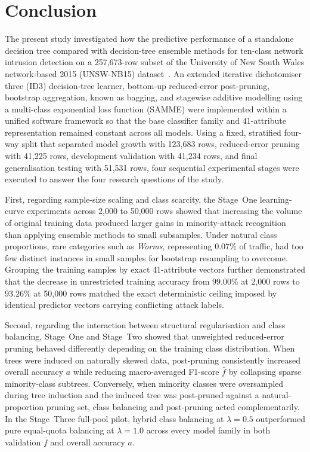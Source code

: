 \section{Conclusion}
\label{sec:conclusion}

The present study investigated how the predictive performance of a standalone decision tree compared with decision-tree ensemble methods for ten-class network intrusion detection on a 257,673-row subset of the University of New South Wales network-based 2015 (UNSW-NB15) dataset~\cite{Moustafa2015}. An extended iterative dichotomiser three (ID3) decision-tree learner, bottom-up reduced-error post-pruning, bootstrap aggregation, known as bagging, and stagewise additive modelling using a multi-class exponential loss function (SAMME) were implemented within a unified software framework so that the base classifier family and 41-attribute representation remained constant across all models. Using a fixed, stratified four-way split that separated model growth with 123,683 rows, reduced-error pruning with 41,225 rows, development validation with 41,234 rows, and final generalisation testing with 51,531 rows, four sequential experimental stages were executed to answer the four research questions of the study.

First, regarding sample-size scaling and class scarcity, the Stage~One learning-curve experiments across 2,000 to 50,000 rows showed that increasing the volume of original training data produced larger gains in minority-attack recognition than applying ensemble methods to small subsamples. Under natural class proportions, rare categories such as \emph{Worms}, representing $0.07\%$ of traffic, had too few distinct instances in small samples for bootstrap resampling to overcome. Grouping the training samples by exact 41-attribute vectors further demonstrated that the decrease in unrestricted training accuracy from $99.00\%$ at 2,000 rows to $93.26\%$ at 50,000 rows matched the exact deterministic ceiling imposed by identical predictor vectors carrying conflicting attack labels.

Second, regarding the interaction between structural regularisation and class balancing, Stage~One and Stage~Two showed that unweighted reduced-error pruning behaved differently depending on the training class distribution. When trees were induced on naturally skewed data, post-pruning consistently increased overall accuracy $a$ while reducing macro-averaged F1-score $\bar{f}$ by collapsing sparse minority-class subtrees. Conversely, when minority classes were oversampled during tree induction and the induced tree was post-pruned against a natural-proportion pruning set, class balancing and post-pruning acted complementarily. In the Stage~Three full-pool pilot, hybrid class balancing at $\lambda = 0.5$ outperformed pure equal-quota balancing at $\lambda = 1.0$ across every model family in both validation $\bar{f}$ and overall accuracy $a$.

